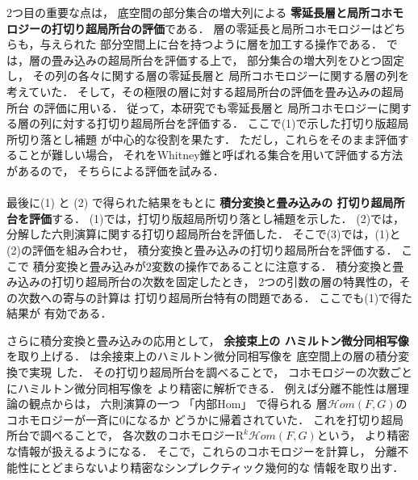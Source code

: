 \documentclass[11pt,a4paper,uplatex,dvipdfmx]{ujarticle} 		%
\newcommand{\研究課題名}{打切り超局所台を用いた層のフーリエ変換の研究とシンプレクティック幾何への応用}
\newcommand{\研究機関名}{北海道大学}
\newcommand{\研究代表者氏名}{大柴寿浩}
\begin{document}
2つ目の重要な点は，
底空間の部分集合の増大列による
\textbf{零延長層と局所コホモロジーの打切り超局所台の評価}である．
層の零延長と局所コホモロジーはどちらも，与えられた
部分空間上に台を持つように層を加工する操作である．
\cite{GS14}では，層の畳み込みの超局所台を評価する上で，
部分集合の増大列をひとつ固定し，
その列の各々に関する層の零延長層と
局所コホモロジーに関する層の列を考えていた．
そして，その極限の層に対する超局所台の評価を畳み込みの超局所台
の評価に用いる．
従って，本研究でも零延長層と
局所コホモロジーに関する層の列に対する打切り超局所台を評価する．
ここで(1)で示した打切り版超局所切り落とし補題
が中心的な役割を果たす．
ただし，これらをそのまま評価することが難しい場合，
それをWhitney錐と呼ばれる集合を用いて評価する方法があるので，
そちらによる評価を試みる．
\vspace{-15pt}
\paragraph*{}
最後に(1) と (2) で得られた結果をもとに
\textbf{積分変換と畳み込みの
打切り超局所台を評価}する．
(1)では，打切り版超局所切り落とし補題を示した．
(2)では，分解した六則演算に関する打切り超局所台を評価した．
そこで(3)では，(1)と(2)の評価を組み合わせ，
積分変換と畳み込みの打切り超局所台を評価する．
ここで
積分変換と畳み込みが2変数の操作であることに注意する．
積分変換と畳み込みの打切り超局所台の次数を固定したとき，
2つの引数の層の特異性の，その次数への寄与の計算は
打切り超局所台特有の問題である．
ここでも(1)で得た結果が
有効である．

さらに積分変換と畳み込みの応用として，
\textbf{余接束上の
ハミルトン微分同相写像
}%
を取り上げる．
\cite{GKS12}は余接束上のハミルトン微分同相写像を
底空間上の層の積分変換で実現
した．
その打切り超局所台を調べることで，
コホモロジーの次数ごとにハミルトン微分同相写像を
より精密に解析できる．
例えば分離不能性は層理論の観点からは，
六則演算の一つ
「内部Hom」
で得られる
層\(\mathcal{H}om(F,G)\)のコホモロジーが一斉に0になるか
どうかに帰着されていた．
これを打切り超局所台で調べることで，
各次数のコホモロジー\(\mathrm{R}^{k}\mathcal{H}om(F,G)\)という，
より精密な情報が扱えるようになる．
そこで，これらのコホモロジーを計算し，
分離不能性にとどまらないより精密なシンプレクティック幾何的な
情報を取り出す．
\end{document}
